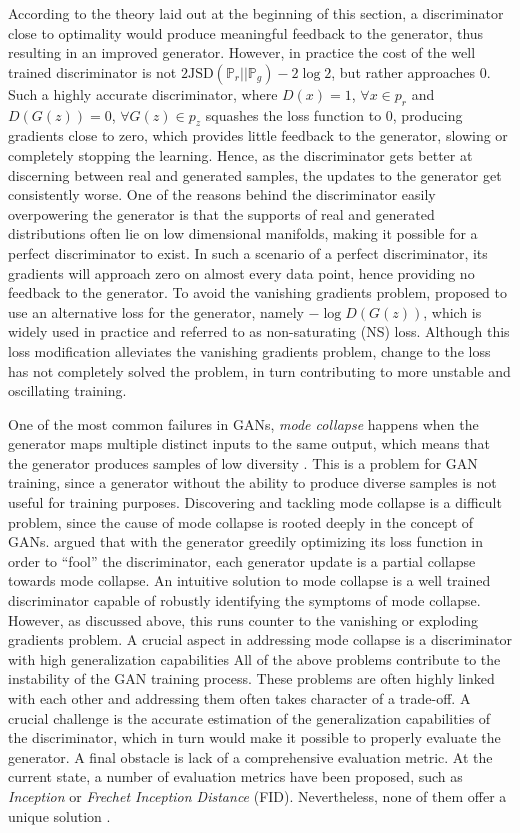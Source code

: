 According to the theory laid out at the beginning of this section, a discriminator close to optimality would produce meaningful feedback to the generator, thus resulting in an improved generator. However, in practice the cost of the well trained discriminator is not $\text{2JSD}(\mathbb{P}_{r}||\mathbb{P}_{g}) - 2\log2$, but rather approaches $0$. Such a highly accurate discriminator, where $D(x)=1$, $\forall x \in p_{r}$ and $D(G(z))=0$, $\forall G(z) \in p_{z}$ squashes the loss function to 0, producing gradients close to zero, which provides little feedback to the generator, slowing or completely stopping the learning. Hence, as the discriminator gets better at discerning between real and generated samples, the updates to the generator get consistently worse. One of the reasons behind the discriminator easily overpowering the generator is that the supports of real and generated distributions often lie on low dimensional manifolds, making it possible for a perfect discriminator to exist. In such a scenario of a perfect discriminator, its gradients will approach zero on almost every data point, hence providing no feedback to the generator. To avoid the vanishing gradients problem,  proposed to use an alternative loss for the generator, namely $-\log D(G(z))$, which is widely used in practice and referred to as non-saturating (NS) loss. Although this loss modification alleviates the vanishing gradients problem, change to the loss has not completely solved the problem, in turn contributing to more unstable and oscillating training.

One of the most common failures in GANs, \textit{mode collapse} happens when the generator maps multiple distinct inputs to the same output, which means that the generator produces samples of low diversity . This is a problem for GAN training, since a generator without the ability to produce diverse samples is not useful for training purposes. Discovering and tackling mode collapse is a difficult problem, since the cause of mode collapse is rooted deeply in the concept of GANs.  argued that with the generator greedily optimizing its loss function in order to ``fool'' the discriminator, each generator update is a partial collapse towards mode collapse. An intuitive solution to mode collapse is a well trained discriminator capable of robustly identifying the symptoms of mode collapse. However, as discussed above, this runs counter to the vanishing or exploding gradients problem. A crucial aspect in addressing mode collapse is a discriminator with high generalization capabilities 
All of the above problems contribute to the instability of the GAN training process. These problems are often highly linked with each other and addressing them often takes character of a trade-off. A crucial challenge is the accurate estimation of the generalization capabilities of the discriminator, which in turn would make it possible to properly evaluate the generator. A final obstacle is lack of a comprehensive evaluation metric. At the current state, a number of evaluation metrics have been proposed, such as \textit{Inception} or \textit{Frechet Inception Distance} (FID). Nevertheless, none of them offer a unique solution .

